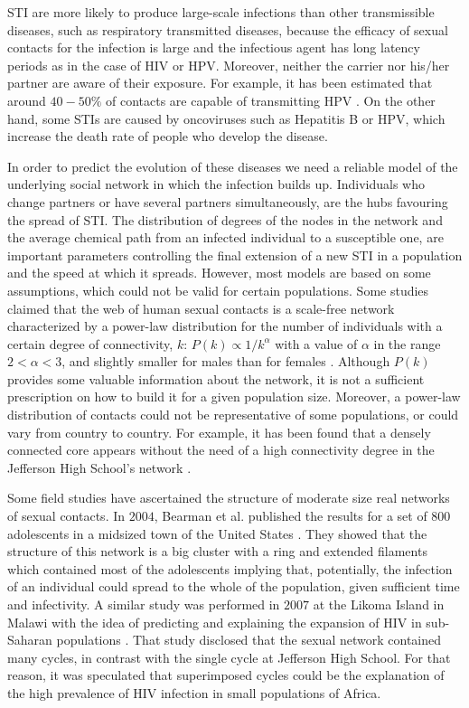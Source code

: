 STI are more likely to produce large-scale infections than other transmissible diseases, such as respiratory transmitted diseases, because the efficacy of sexual contacts for the infection is large and the infectious agent has long latency periods as in the case of HIV or HPV. Moreover, neither the carrier nor his/her partner are aware of their exposure. For example, it has been estimated that around $40-50\%$ of contacts are capable of transmitting HPV \cite{burchell2006modeling}. On the other hand, some STIs are caused by oncoviruses such as Hepatitis B or HPV, which increase the death rate of people who develop the disease.

In order to predict the evolution of these diseases we need a reliable model of the underlying social network in which the infection builds up. Individuals who change partners or have several partners simultaneously, are the hubs favouring the spread of STI. The distribution of degrees of the nodes in the network and the average chemical path from an infected individual to a susceptible one, are important parameters controlling the final extension of a new STI in a population and the speed at which it spreads. However, most models are based on some assumptions, which could not be valid for certain populations. Some studies claimed that the web of human sexual contacts is a scale-free network characterized by a power-law distribution for the number of individuals with a certain degree of connectivity, $k$: $P(k)\propto 1/k^\alpha$ with a value of $\alpha$ in the range $2 <\alpha < 3$, and slightly smaller for males than for females \cite{liljeros2001web}. Although $P(k)$ provides some valuable information about the network, it is not a sufficient prescription on how to build it for a given population size. Moreover, a power-law distribution of contacts could not be representative of some populations, or could vary from country to country. For example, it has been found that a densely connected core appears without the need of a high connectivity degree in the Jefferson High School's network \cite{bearman2004chains}. 

Some field studies have ascertained the structure of moderate size real networks of sexual contacts. In $2004$, Bearman et al. published the results for a set of $800$ adolescents in a midsized town of the United States \cite{bearman2004chains}. They  showed that the structure of this network is a big cluster with a ring and extended filaments which contained most of the adolescents implying that, potentially, the infection of an individual could spread to the whole of the population, given sufficient time and infectivity. A similar study was performed in $2007$ at the Likoma Island in Malawi with the idea of predicting and explaining the expansion of HIV in sub-Saharan populations \cite{helleringer2007sexual}. That study disclosed  that the sexual network contained many cycles, in contrast with the single cycle at Jefferson High School. For that reason, it was speculated that superimposed cycles could be the explanation of the high prevalence of HIV infection in small populations of Africa.

